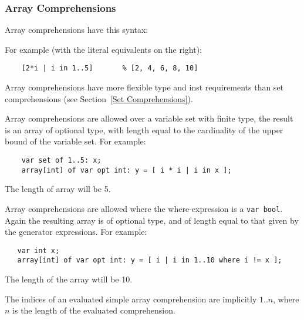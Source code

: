 \documentclass[10pt]{scrartcl}
\newcommand{\ignore}[1]{}
\begin{document}
\subsubsection{Array Comprehensions}
        \label{Array Comprehensions}
Array comprehensions have this syntax:
\begin{productions}
    \RuleSimpleArrayComp
\end{productions}
For example (with the literal equivalents on the right):
\begin{verbatim}
    [2*i | i in 1..5]       % [2, 4, 6, 8, 10]
\end{verbatim}

Array comprehensions have more flexible type and inst requirements than set
comprehensions (see Section~\ref{Set Comprehensions}).

Array comprehensions are allowed over a variable set with finite type, the
result is an array of optional type, with length equal to the 
cardinality of the upper bound of the variable set.
For example:
\begin{verbatim}
    var set of 1..5: x;
    array[int] of var opt int: y = [ i * i | i in x ];
\end{verbatim}
The length of array will be 5. 

Array comprehensions are allowed where the where-expression is a \texttt{var
  bool}. Again the resulting array is of optional type, and of length
equal to that given by the generator expressions.
For example:
\begin{verbatim}
   var int x;
   array[int] of var opt int: y = [ i | i in 1..10 where i != x ];
\end{verbatim}
The length of the array wtill be 10.

The indices of an evaluated simple array comprehension are implicitly
$1..n$, where $n$ is the length of the evaluated comprehension.

\ignore{
\subsubsection{Indexed Array Comprehensions}
        \label{Indexed Array Comprehensions}
Indexed array comprehensions have this syntax:
\begin{productions}
    \RuleIndexedArrayComp
\end{productions}
For example (with the literal equivalent on the right):
\begin{verbatim}
    [i:2*i | i in 1..4]             % [1:2, 2:4, 3:6, 4:8]
\end{verbatim}

Simple array comprehensions have the same type and inst requirements as set
comprehensions (see Section~\ref{Set Comprehensions}).

The keys need not be computed in order.
}
\end{document}

